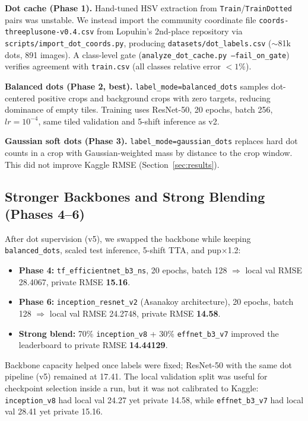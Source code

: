 \documentclass[12pt, a4paper]{article}
\begin{document}
\textbf{Dot cache (Phase 1).} Hand-tuned HSV extraction from \texttt{Train}/\texttt{TrainDotted} pairs was unstable. We instead import the community coordinate file \texttt{coords-threeplusone-v0.4.csv} from Lopuhin's 2nd-place repository \cite{lopuhin2017} via \texttt{scripts/import\_dot\_coords.py}, producing \texttt{datasets/dot\_labels.csv} ($\sim$81k dots, 891 images). A class-level gate (\texttt{analyze\_dot\_cache.py --fail\_on\_gate}) verifies agreement with \texttt{train.csv} (all classes relative error $<1\%$).

\textbf{Balanced dots (Phase 2, best).} \texttt{label\_mode=balanced\_dots} samples dot-centered positive crops and background crops with zero targets, reducing dominance of empty tiles. Training uses ResNet-50, 20 epochs, batch 256, $lr=10^{-4}$, same tiled validation and 5-shift inference as v2.

\textbf{Gaussian soft dots (Phase 3).} \texttt{label\_mode=gaussian\_dots} replaces hard dot counts in a crop with Gaussian-weighted mass by distance to the crop window. This did not improve Kaggle RMSE (Section~\ref{sec:results}).

\subsection{Stronger Backbones and Strong Blending (Phases 4--6)}
After dot supervision (v5), we swapped the backbone while keeping \texttt{balanced\_dots}, scaled test inference, 5-shift TTA, and pup$\times$1.2:
\begin{itemize}
    \item \textbf{Phase 4:} \texttt{tf\_efficientnet\_b3\_ns}, 20 epochs, batch 128 $\Rightarrow$ local val RMSE 28.4067, private RMSE \textbf{15.16}.
    \item \textbf{Phase 6:} \texttt{inception\_resnet\_v2} (Asanakoy architecture), 20 epochs, batch 128 $\Rightarrow$ local val RMSE 24.2748, private RMSE \textbf{14.58}.
    \item \textbf{Strong blend:} 70\% \texttt{inception\_v8} + 30\% \texttt{effnet\_b3\_v7} improved the leaderboard to private RMSE \textbf{14.44129}.
\end{itemize}
Backbone capacity helped once labels were fixed; ResNet-50 with the same dot pipeline (v5) remained at 17.41. The local validation split was useful for checkpoint selection inside a run, but it was not calibrated to Kaggle: \texttt{inception\_v8} had local val 24.27 yet private 14.58, while \texttt{effnet\_b3\_v7} had local val 28.41 yet private 15.16.
\end{document}
